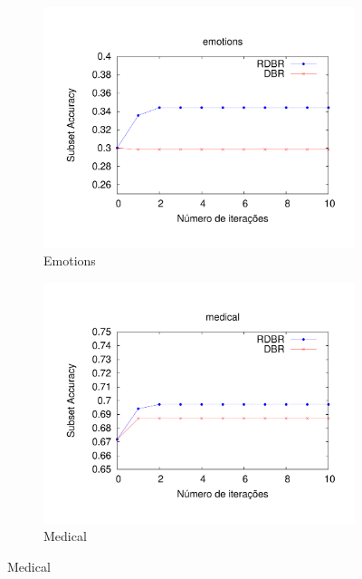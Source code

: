 \begin{figure}
\centering
\begin{subfigure}{.5\textwidth}
  \centering
  \includegraphics[angle=-90, width=1\linewidth]{plots/emotions}
  \caption{Emotions}
  \label{fig:subemotions}
\end{subfigure}%
\begin{subfigure}{.5\textwidth}
  \centering
  \includegraphics[angle=-90, width=1\linewidth]{plots/medical}
  \caption{Medical}
  \label{fig:submedical}
\end{subfigure}


\end{figure}
